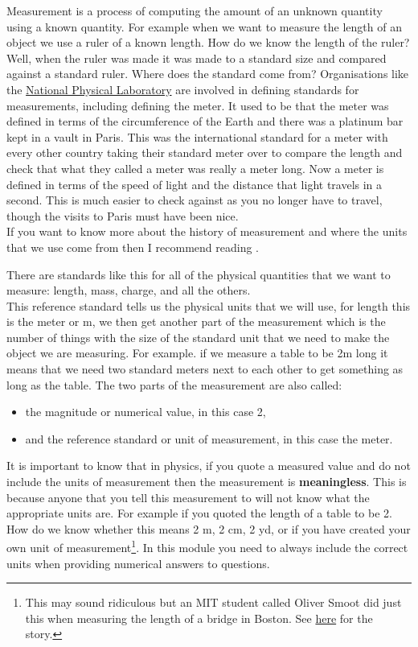 \documentclass[a4paper,12pt]{book}
\begin{document}
Measurement is a process of computing the amount of an unknown quantity using a known quantity. For example when we want to measure the length of an object we use a ruler of a known length. How do we know the length of the ruler? Well, when the ruler was made it was made to a standard size and compared against a standard ruler. Where does the standard come from? Organisations like the \href{https://www.npl.co.uk/products-services/instruments/standard}{National Physical Laboratory} are involved in defining standards for measurements, including defining the meter. It used to be that the meter was defined in terms of the circumference of the Earth and there was a platinum bar kept in a vault in Paris. This was the international standard for a meter with every other country taking their standard meter over to compare the length and check that what they called a meter was really a meter long. Now a meter is defined in terms of the speed of light and the distance that light travels in a second. This is much easier to check against as you no longer have to travel, though the visits to Paris must have been nice.\\

If you want to know more about the history of measurement and where the units that we use come from then I recommend reading \citep{vincent2022beyond}.

There are standards like this for all of the physical quantities that we want to measure: length, mass, charge, and all the others. \\


This reference standard tells us the physical units that we will use, for length this is the meter or m, we then get another part of the measurement which is the number of things with the size of the standard unit that we need to make the object we are measuring. For example. if we measure a table to be 2m long it means that we need two standard meters next to each other to get something as long as the table. The two parts of the measurement are also called:
\begin{itemize}
\setlength{\itemsep}{-5pt}
    \item the magnitude or numerical value, in this case 2,
    \item and the reference standard or unit of measurement, in this case the meter.
\end{itemize}

It is important to know that in physics, if you quote a measured value and do not include the units of measurement then the measurement is \textbf{meaningless}. This is because anyone that you tell this measurement to will not know what the appropriate units are. For example if you quoted the length of a table to be 2. How do we know whether this means 2 m, 2 cm, 2 yd, or if you have created your own unit of measurement\footnote{This may sound ridiculous but an MIT student called Oliver Smoot did just this when measuring the length of a bridge in Boston. See \href{https://en.wikipedia.org/wiki/Smoot}{here} for the story.}. In this module you need to always include the correct units when providing numerical answers to questions.\\
\end{document}
